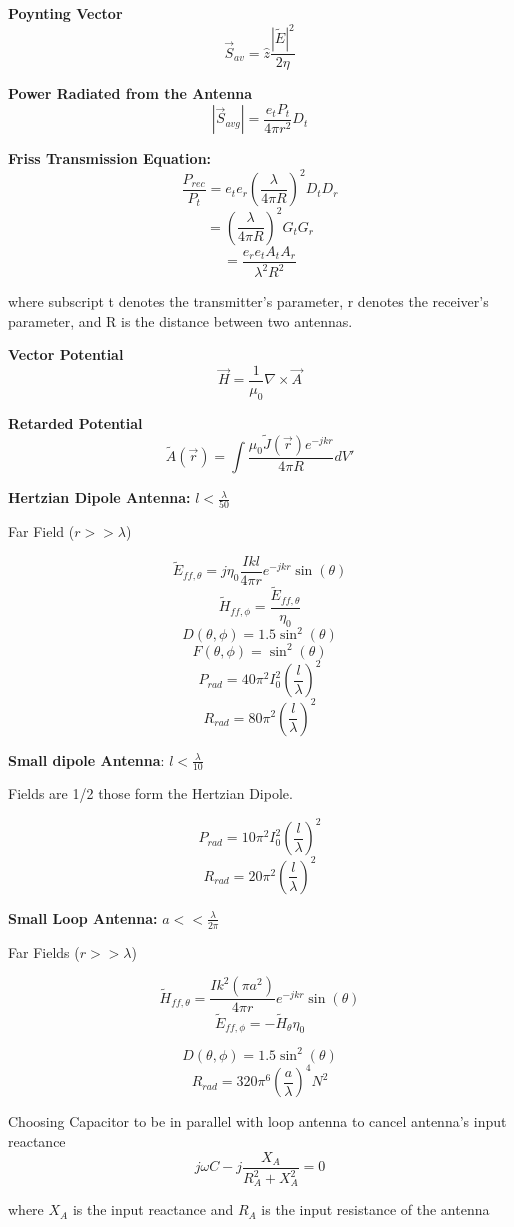 \documentclass{article} %
\begin{document}
\textbf{Poynting Vector}
\[\vec{S}_{av} = \hat{z}\frac{|\widetilde{E}|^2}{2 \eta}\]

\textbf{Power Radiated from the Antenna}
\[|\vec{S}_{avg}| = \frac{e_t P_{t}}{4 \pi r^2}D_t\]

\textbf{Friss Transmission Equation:}
\[\frac{P_{rec}}{P_t} = e_t e_r \left(\frac{\lambda}{4\pi R}\right)^2 D_t D_r\]
\[=\left(\frac{\lambda}{4\pi R}\right)^2 G_t G_r\]
\[=\frac{e_r e_t A_t A_r}{\lambda^2 R^2}\]

\begin{center}
    where subscript t denotes the transmitter's parameter, r denotes the receiver's parameter, and R is the distance between two antennas.
\end{center}

\textbf{Vector Potential}
\[\vec{H} = \frac{1}{\mu_0} \nabla \times \vec{A}\]

\textbf{Retarded Potential}
\[\widetilde{A}(\vec{r}) = \int \frac{\mu_0 \widetilde{J}(\vec{r})e^{-jkr}}{4\pi R} dV'\]



\textbf{Hertzian Dipole Antenna:}
$l < \frac{\lambda}{50}$

Far Field ($r >> \lambda$)

\[\widetilde{E}_{ff, \theta} = j \eta_0 \frac{I k l}{4 \pi r} e^{-jkr} \sin(\theta)\]
\[\widetilde{H}_{ff, \phi} = \frac{\widetilde{E}_{ff, \theta}}{\eta_0}\]
\[D(\theta, \phi) = 1.5 \sin^2(\theta)\]
\[F(\theta, \phi) = \sin^2(\theta)\]
\[P_{rad} = 40 \pi^2 I_0^2\left(\frac{l}{\lambda}\right)^2\]
\[R_{rad} = 80 \pi^2 \left(\frac{l}{\lambda}\right)^2\]

\textbf{Small dipole Antenna}: $l < \frac{\lambda}{10}$

Fields are 1/2 those form the Hertzian Dipole.

\[P_{rad} = 10 \pi^2 I_0^2\left(\frac{l}{\lambda}\right)^2\]
\[R_{rad} = 20 \pi^2 \left(\frac{l}{\lambda}\right)^2\]

\textbf{Small Loop Antenna:}
$a << \frac{\lambda}{2 \pi}$

Far Fields ($r >> \lambda$)

\[\widetilde{H}_{ff, \theta} = \frac{I k^2 (\pi a^2) }{4 \pi r} e^{-jkr}\sin(\theta)\]
\[\widetilde{E}_{ff, \phi} = -\widetilde{H}_{\theta} \eta_0\]

\[D(\theta, \phi) = 1.5 \sin^2(\theta)\]
\[R_{rad} = 320 \pi^6 \left(\frac{a}{\lambda}\right)^4 N^2\]

Choosing Capacitor to be in parallel with loop antenna to cancel antenna's input reactance
\[j\omega C - j \frac{X_A}{R_A^2 + X_A^2} = 0\]

\begin{center}
    where $X_A$ is the input reactance and $R_A$ is the input resistance of the antenna
\end{center}
\end{document}
